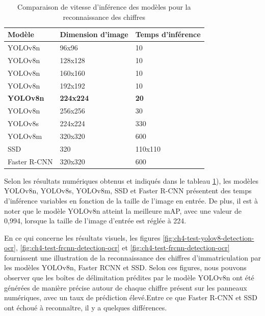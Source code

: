 \begin{table}[H]
    \centering
    \begin{tabular}{|l|l|l|}
    \hline
        Modèle  & Dimension d'image & Temps d'inférence \\ \hline
        YOLOv8n & 96x96& 10 \\ \hline
        YOLOv8n & 128x128 & 10 \\ \hline
        YOLOv8n & 160x160 & 10 \\ \hline
        YOLOv8n & 192x192 & 10 \\ \hline
        \textbf{YOLOv8n} & \textbf{224x224} & \textbf{20} \\ \hline
        YOLOv8n & 256x256 & 30 \\ \hline
        YOLOv8s & 224x224 & 330 \\ \hline
         YOLOv8m & 320x320 & 600 \\ \hline
        SSD & 320 & 110x110 \\ \hline
        Faster R-CNN & 320x320 & 600 \\ \hline
    \end{tabular}
    \caption{Comparaison de vitesse d'inférence des modèles pour la reconnaissance des chiffres}
    \label{table:ch4-test_speed_ocr_allmodels}
\end{table}

Selon les résultats numériques obtenus et indiqués dans le tableau \ref{table:ch4-test_speed_ocr_allmodels}), les modèles YOLOv8n, YOLOv8s, YOLOv8m, SSD et Faster R-CNN présentent des temps d'inférence variables en fonction de la taille de l'image en entrée. De plus, il est à noter que le modèle YOLOv8n atteint la meilleure mAP, avec une valeur de 0,994, lorsque la taille de l'image d'entrée est réglée à 224.

En ce qui concerne les résultats visuels, les figures \ref{fig:ch4-test-yolov8-detection-ocr}, \ref{fig:ch4-test-frcnn-detection-ocr} et \ref{fig:ch4-test-frcnn-detection-ocr} fournissent une illustration de la reconnaissance des chiffres d’immatriculation par les modèles YOLOv8n, Faster RCNN et SSD. 
Selon ces figures, nous pouvons observer que les boîtes de délimitation prédites par le modèle YOLOv8n ont été générées de manière précise autour de chaque chiffre présent sur les panneaux numériques, avec un taux de prédiction élevé.Entre ce que Faster R-CNN et SSD ont échoué à reconnaître, il y a quelques différences.

